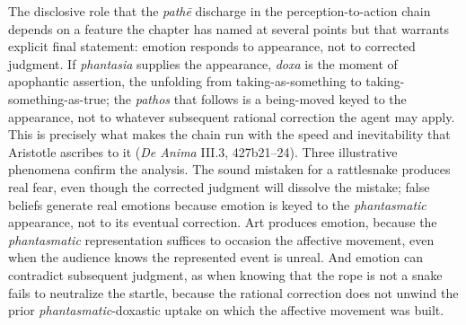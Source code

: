 \documentclass{article}
\begin{document}
The disclosive role that the \textit{pathē} discharge in the perception-to-action chain depends on a feature the chapter has named at several points but that warrants explicit final statement: emotion responds to appearance, not to corrected judgment. If \textit{phantasia} supplies the appearance, \textit{doxa} is the moment of apophantic assertion, the unfolding from taking-as-something to taking-something-as-true; the \textit{pathos} that follows is a being-moved keyed to the appearance, not to whatever subsequent rational correction the agent may apply. This is precisely what makes the chain run with the speed and inevitability that Aristotle ascribes to it (\textit{De Anima} III.3, 427b21--24). Three illustrative phenomena confirm the analysis. The sound mistaken for a rattlesnake produces real fear, even though the corrected judgment will dissolve the mistake; false beliefs generate real emotions because emotion is keyed to the \textit{phantasmatic} appearance, not to its eventual correction. Art produces emotion, because the \textit{phantasmatic} representation suffices to occasion the affective movement, even when the audience knows the represented event is unreal. And emotion can contradict subsequent judgment, as when knowing that the rope is not a snake fails to neutralize the startle, because the rational correction does not unwind the prior \textit{phantasmatic}-doxastic uptake on which the affective movement was built.
\end{document}
